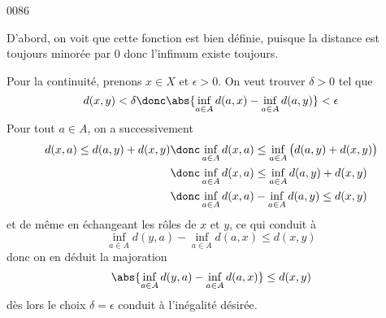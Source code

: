 
\begin{corrige}{0086}

D'abord, on voit que cette fonction est bien définie, puisque la
distance est toujours minorée par $0$ donc l'infimum existe toujours.

Pour la continuité, prenons $x \in X$ et $\epsilon > 0$. On veut trouver $\delta>0$ tel que
\[d(x,y) < \delta \donc \abs{\inf_{a \in A} d(a,x) - \inf_{a\in A} d(a,y)} < \epsilon\]
Pour tout
$a\in A$, on a successivement
\begin{align*}
d(x,a) \leq d(a,y) + d(x,y) \donc& \inf_{a\in A} d(x,a) \leq \inf_{a\in A} \big(d(a,y) + d(x,y)\big)\\
\donc& \inf_{a \in A} d(x,a) \leq \inf_{a\in A} d(a,y) + d(x,y)\\
\donc& \inf_{a \in A} d(x,a) - \inf_{a\in A} d(a,y) \leq d(x,y)
\end{align*}
et de même en échangeant les rôles de $x$ et $y$, ce qui conduit à
\[\inf_{a \in A} d(y,a) - \inf_{a\in A} d(a,x) \leq d(x,y)\]
donc on en déduit la majoration
\begin{equation}		\label{eqex13}
	\abs{\inf_{a \in A} d(y,a) - \inf_{a\in A} d(a,x)} \leq d(x,y)
\end{equation}
dès lors le choix $\delta = \epsilon$ conduit à l'inégalité désirée.

\end{corrige}
